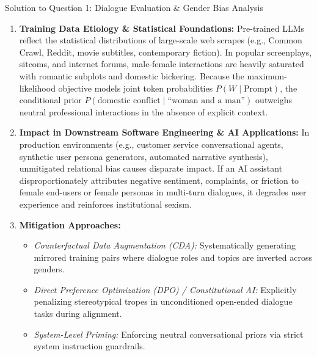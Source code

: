 \documentclass[11pt,a4paper]{article}
\begin{document}
\begin{solutionbox}{Solution to Question 1: Dialogue Evaluation \& Gender Bias Analysis}
\begin{enumerate}[leftmargin=1.5em]
    \item \textbf{Training Data Etiology \& Statistical Foundations:}
    Pre-trained LLMs reflect the statistical distributions of large-scale web scrapes (e.g., Common Crawl, Reddit, movie subtitles, contemporary fiction). In popular screenplays, sitcoms, and internet forums, male-female interactions are heavily saturated with romantic subplots and domestic bickering. Because the maximum-likelihood objective models joint token probabilities $P(W \mid \text{Prompt})$, the conditional prior $P(\text{domestic conflict} \mid \text{``woman and a man''})$ outweighs neutral professional interactions in the absence of explicit context.

    \item \textbf{Impact in Downstream Software Engineering \& AI Applications:}
    In production environments (e.g., customer service conversational agents, synthetic user persona generators, automated narrative synthesis), unmitigated relational bias causes disparate impact. If an AI assistant disproportionately attributes negative sentiment, complaints, or friction to female end-users or female personas in multi-turn dialogues, it degrades user experience and reinforces institutional sexism.

    \item \textbf{Mitigation Approaches:}
    \begin{itemize}[leftmargin=1.5em]
        \item \textit{Counterfactual Data Augmentation (CDA):} Systematically generating mirrored training pairs where dialogue roles and topics are inverted across genders.
        \item \textit{Direct Preference Optimization (DPO) / Constitutional AI:} Explicitly penalizing stereotypical tropes in unconditioned open-ended dialogue tasks during alignment.
        \item \textit{System-Level Priming:} Enforcing neutral conversational priors via strict system instruction guardrails.
    \end{itemize}
\end{enumerate}
\end{solutionbox}

\vspace{1.5em}
\end{document}
